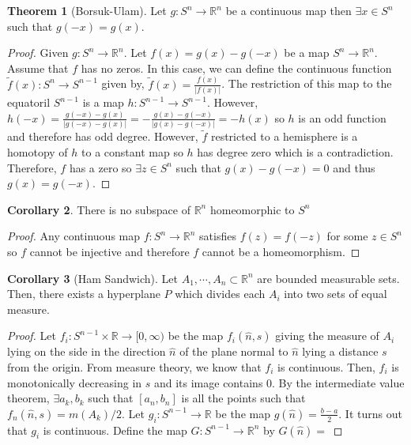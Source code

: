 \documentclass[12pt]{extarticle}
\newcommand{\R}{\mathbb{R}}
\theoremstyle{definition}
\newtheorem{theorem}{Theorem}[section]
\newtheorem{corollary}[theorem]{Corollary}
\begin{document}
\begin{theorem}[Borsuk-Ulam]
Let $g : S^n \to \R^n$ be a continuous map then $\exists x \in S^n$ such that $g(-x) = g(x)$. 
\end{theorem}

\begin{proof}
Given $g : S^n \to \R^n$. Let $f(x) = g(x) - g(-x)$ be a map $S^n \to \R^n$. Assume that $f$ has no zeros. In this case, we can define the continuous function $\tilde{f}(x) : S^n \to S^{n-1}$ given by, $\tilde{f}(x) = \frac{f(x)}{|f(x)|}$. The restriction of this map to the equatoril $S^{n-1}$ is a map $h : S^{n-1} \to S^{n-1}$. However, $h(-x) = \frac{g(-x) - g(x)}{|g(-x) - g(x)|} = - \frac{g(x) - g(-x)}{|g(x) - g(-x)|} = - h(x)$ so $h$ is an odd function and therefore has odd degree. However, $\tilde{f}$ restricted to a hemisphere is a homotopy of $h$ to a constant map so $h$ has degree zero which is a contradiction. Therefore, $f$ has a zero so $\exists z \in S^n$ such that $g(x) - g(-x) = 0$ and thus $g(x) = g(-x)$.  
\end{proof}

\begin{corollary}
There is no subspace of $\R^n$ homeomorphic to $S^n$
\end{corollary}

\begin{proof}
Any continuous map $f : S^n \to \R^n$ satisfies $f(z) = f(-z)$ for some $z \in S^n$ so $f$ cannot be injective and therefore $f$ cannot be a homeomorphism.  
\end{proof}

\begin{corollary}[Ham Sandwich]
Let $A_1, \cdots, A_n \subset \R^n$ are bounded measurable sets. Then, there exists a hyperplane $P$ which divides each $A_i$ into two sets of equal measure.
\end{corollary}

\begin{proof}
Let $f_i : S^{n-1} \times \R \to [0, \infty)$ be the map $f_i(\hat{n},s)$ giving the measure of $A_i$ lying on the side in the direction $\hat{n}$ of the plane normal to $\hat{n}$ lying a distance $s$ from the origin. From measure theory, we know that $f_i$ is continuous. Then, $f_i$ is monotonically decreasing in $s$ and its image contains $0$. By the intermediate value theorem, $\exists a_k, b_k$ such that $[a_n, b_n]$ is all the points such that $f_n(\hat{n}, s) = m(A_k)/2$. Let $g_i : S^{n-1} \to \R$ be the map $g(\hat{n}) = \frac{b-a}{2}$. It turns out that $g_i$ is continuous. Define the map $G : S^{n-1} \to \R^n$ by $G(\hat{n}) = $
\end{proof}
\end{document}

